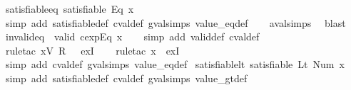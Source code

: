 \begin{isabellebody}
\endisatagproof
{\isafoldproof}%
%
\isadelimproof
\isanewline
%
\endisadelimproof
\isanewline
{}\isamarkupfalse%
\ satisfiable{\isacharunderscore}eq{\isacharcolon}\ {\isachardoublequoteopen}satisfiable\ {\isacharparenleft}Eq\ x{\isacharparenright}{\isachardoublequoteclose}\isanewline
%
\isadelimproof
\ \ %
\endisadelimproof
%
\isatagproof
{}\isamarkupfalse%
\ {\isacharparenleft}simp\ add{\isacharcolon}\ satisfiable{\isacharunderscore}def\ cval{\isacharunderscore}def\ gval{\isachardot}simps\ value_eq{\isacharunderscore}def{\isacharparenright}\isanewline
\ \ \isamarkupfalse%
\ aval{\isachardot}simps{\isacharparenleft}{}{\isacharparenright}\ \isamarkupfalse%
\ blast%
\endisatagproof
{\isafoldproof}%
%
\isadelimproof
\isanewline
%
\endisadelimproof
\isanewline
{}\isamarkupfalse%
\ invalid{\isacharunderscore}eq{\isacharcolon}\ {\isachardoublequoteopen}{\isasymnot}\ valid\ {\isacharparenleft}cexp{\isachardot}Eq\ x{\isacharparenright}{\isachardoublequoteclose}\isanewline
%
\isadelimproof
\ \ %
\endisadelimproof
%
\isatagproof
{}\isamarkupfalse%
\ {\isacharparenleft}simp\ add{\isacharcolon}\ valid{\isacharunderscore}def\ cval{\isacharunderscore}def{\isacharparenright}\isanewline
\ \ \isamarkupfalse%
\ {\isacharparenleft}rule{\isacharunderscore}tac\ x{\isacharequal}{\isachardoublequoteopen}V\ {\isacharparenleft}R\ {}{\isacharparenright}{\isachardoublequoteclose}\ \ exI{\isacharparenright}\isanewline
\ \ \isamarkupfalse%
\ {\isacharparenleft}rule{\isacharunderscore}tac\ x{\isacharequal}{\isachardoublequoteopen}{\isacharless}{\isachargreater}{\isachardoublequoteclose}\ \ exI{\isacharparenright}\isanewline
\ \ \isamarkupfalse%
\ {\isacharparenleft}simp\ add{\isacharcolon}\ cval{\isacharunderscore}def\ gval{\isachardot}simps\ value_eq{\isacharunderscore}def{\isacharparenright}%
\endisatagproof
{\isafoldproof}%
%
\isadelimproof
\isanewline
%
\endisadelimproof
\isanewline
{}\isamarkupfalse%
\ satisfiable{\isacharunderscore}lt{\isacharcolon}\ {\isachardoublequoteopen}satisfiable\ {\isacharparenleft}Lt\ {\isacharparenleft}Num\ x{\isacharparenright}{\isacharparenright}{\isachardoublequoteclose}\isanewline
%
\isadelimproof
\ \ %
\endisadelimproof
%
\isatagproof
{}\isamarkupfalse%
\ {\isacharparenleft}simp\ add{\isacharcolon}\ satisfiable{\isacharunderscore}def\ cval{\isacharunderscore}def\ gval{\isachardot}simps\ value_gt{\isacharunderscore}def{\isacharparenright}\isanewline

\end{isabellebody}
